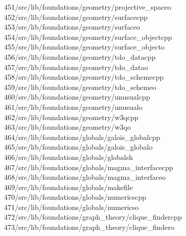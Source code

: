 \begin{tabbing}
451\>/src/lib/foundations/geometry/projective\_spaceo\\[0pt]
452\>/src/lib/foundations/geometry/surfacecpp\\[0pt]
453\>/src/lib/foundations/geometry/surfaceo\\[0pt]
454\>/src/lib/foundations/geometry/surface\_objectcpp\\[0pt]
455\>/src/lib/foundations/geometry/surface\_objecto\\[0pt]
456\>/src/lib/foundations/geometry/tdo\_datacpp\\[0pt]
457\>/src/lib/foundations/geometry/tdo\_datao\\[0pt]
458\>/src/lib/foundations/geometry/tdo\_schemecpp\\[0pt]
459\>/src/lib/foundations/geometry/tdo\_schemeo\\[0pt]
460\>/src/lib/foundations/geometry/unusualcpp\\[0pt]
461\>/src/lib/foundations/geometry/unusualo\\[0pt]
462\>/src/lib/foundations/geometry/w3qcpp\\[0pt]
463\>/src/lib/foundations/geometry/w3qo\\[0pt]
464\>/src/lib/foundations/globals/galois\_globalcpp\\[0pt]
465\>/src/lib/foundations/globals/galois\_globalo\\[0pt]
466\>/src/lib/foundations/globals/globalsh\\[0pt]
467\>/src/lib/foundations/globals/magma\_interfacecpp\\[0pt]
468\>/src/lib/foundations/globals/magma\_interfaceo\\[0pt]
469\>/src/lib/foundations/globals/makefile\\[0pt]
470\>/src/lib/foundations/globals/numericscpp\\[0pt]
471\>/src/lib/foundations/globals/numericso\\[0pt]
472\>/src/lib/foundations/graph\_theory/clique\_findercpp\\[0pt]
473\>/src/lib/foundations/graph\_theory/clique\_findero\\[0pt]

\end{tabbing}
